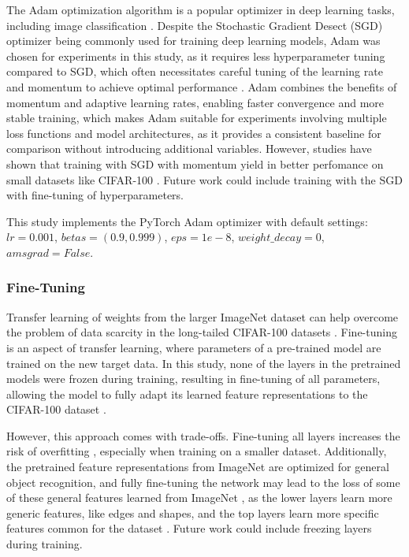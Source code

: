 The Adam optimization algorithm \cite{kingma2017adammethodstochasticoptimization} is a popular optimizer in deep learning tasks, including image classification \cite{kandel2020,loshchilov2018fixing}. Despite the Stochastic Gradient Desect (SGD) optimizer being commonly used for training deep learning models, Adam was chosen for experiments in this study, as it requires less hyperparameter tuning compared to SGD, which often necessitates careful tuning of the learning rate and momentum to achieve optimal performance \cite{kingma2017adammethodstochasticoptimization}. Adam combines the benefits of momentum and adaptive learning rates, enabling faster convergence and more stable training, which makes Adam suitable for experiments involving multiple loss functions and model architectures, as it provides a consistent baseline for comparison without introducing additional variables. However, studies have shown that training with SGD with momentum yield in better perfomance on small datasets like CIFAR-100 \cite{menon2021longtaillearninglogitadjustment}. Future work could include training with the SGD with fine-tuning of hyperparameters.

This study implements the PyTorch Adam optimizer \cite{pytorch_adam} with default settings: $lr=0.001$, $betas=(0.9, 0.999)$, $eps=1e-8$, $weight\_decay=0$, $amsgrad=False$.


\subsubsection{Fine-Tuning}
Transfer learning of weights from the larger ImageNet dataset can help overcome the problem of data scarcity in the long-tailed CIFAR-100 datasets \cite{cs231n,ye2023partialfinetuningsuccessorfinetuning,kandel2020}. Fine-tuning is an aspect of transfer learning, where parameters of a pre-trained model are trained on the new target data. In this study, none of the layers in the pretrained models were frozen during training, resulting in fine-tuning of all parameters, allowing the model to fully adapt its learned feature representations to the CIFAR-100 dataset \cite{ye2023partialfinetuningsuccessorfinetuning}. 

However, this approach comes with trade-offs. Fine-tuning all layers increases the risk of overfitting \cite{cs231n}, especially when training on a smaller dataset. Additionally, the pretrained feature representations from ImageNet are optimized for general object recognition, and fully fine-tuning the network may lead to the loss of some of these general features learned from ImageNet \cite{cs231n}, as the lower layers learn more generic features, like edges and shapes, and the top layers learn more specific features common for the dataset \cite{yosinski2014transferablefeaturesdeepneural}. Future work could include freezing layers during training. 

